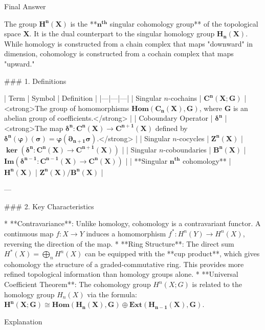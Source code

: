 Final Answer

The group \( \boldsymbol{H^n(X)} \) is the **\( \boldsymbol{n^{\text{th}}} \) singular cohomology group** of the topological space \( \boldsymbol{X} \). It is the dual counterpart to the singular homology group \( \boldsymbol{H_n(X)} \). While homology is constructed from a chain complex that maps "downward" in dimension, cohomology is constructed from a cochain complex that maps "upward."

### 1. Definitions

| Term | Symbol | Definition |
|---|---|---|
| Singular \( n \)-cochains | \( \boldsymbol{C^n(X; G)} \) | <strong>The group of homomorphisms \( \boldsymbol{\text{Hom}(C_n(X), G)} \), where \( \boldsymbol{G} \) is an abelian group of coefficients.</strong> |
| Coboundary Operator | \( \boldsymbol{\delta^n} \) | <strong>The map \( \boldsymbol{\delta^n: C^n(X) \to C^{n+1}(X)} \) defined by \( \boldsymbol{\delta^n(\varphi)(\sigma) = \varphi(\partial_{n+1}\sigma)} \).</strong> |
| Singular \( n \)-cocycles | \( \boldsymbol{Z^n(X)} \) | \( \boldsymbol{\ker(\delta^n: C^n(X) \to C^{n+1}(X))} \) |
| Singular \( n \)-coboundaries | \( \boldsymbol{B^n(X)} \) | \( \boldsymbol{\text{Im}(\delta^{n-1}: C^{n-1}(X) \to C^n(X))} \) |
| **Singular \( \boldsymbol{n^{\text{th}}} \) cohomology** | \( \boldsymbol{H^n(X)} \) | \( \boldsymbol{Z^n(X) / B^n(X)} \) |

---

### 2. Key Characteristics

*   **Contravariance**: Unlike homology, cohomology is a contravariant functor. A continuous map \( f: X \to Y \) induces a homomorphism \( f^*: H^n(Y) \to H^n(X) \), reversing the direction of the map.
*   **Ring Structure**: The direct sum \( H^*(X) = \bigoplus_n H^n(X) \) can be equipped with the **cup product**, which gives cohomology the structure of a graded-commutative ring. This provides more refined topological information than homology groups alone.
*   **Universal Coefficient Theorem**: The cohomology group \( H^n(X; G) \) is related to the homology group \( H_n(X) \) via the formula:
    \( \boldsymbol{H^n(X; G) \cong \text{Hom}(H_n(X), G) \oplus \text{Ext}(H_{n-1}(X), G)} \).

Explanation

